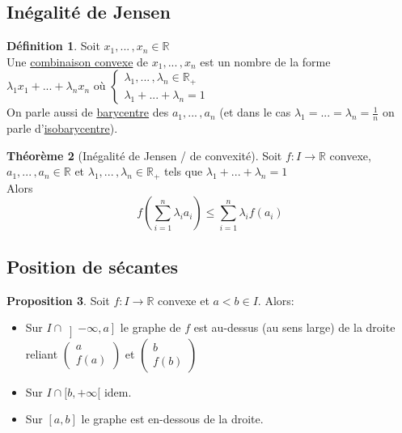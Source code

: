 \documentclass[10pt,a4paper]{article}
\theoremstyle{definition}
\newtheorem{proposition}{Proposition}[section]
\newtheorem{theorem}[proposition]{Théorème}
\newtheorem{definition}[proposition]{Définition}
\begin{document}
\subsection{Inégalité de Jensen}
\begin{definition}
Soit $x_1, ...\, , x_n \in \mathbb{R}$ \\
Une \uline{combinaison convexe} de $x_1, ...\, , x_n$ est un nombre de la forme $\lambda_1 x_1 + ... + \lambda_n x_n$ où $\begin{cases}
\lambda_1, ...\, , \lambda_n \in \mathbb{R}_+ \\
\lambda_1 + ... + \lambda_n = 1
\end{cases}$  \\
On parle aussi de \uline{barycentre} des $a_1, ...\, , a_n$ (et dans le cas $\lambda_1 = ... = \lambda_n = \frac{1}{n}$ on parle d'\uline{isobarycentre}).
\end{definition}
\begin{theorem}[Inégalité de Jensen / de convexité]
Soit $f: I \to \mathbb{R}$ convexe, $a_1, ...\, , a_n \in \mathbb{R}$ et $\lambda_1, ...\, , \lambda_n \in \mathbb{R}_+$ tels que $\lambda_1 + ... + \lambda_n = 1$ \\
Alors
\[f(\sum_{i = 1}^n \lambda_i a_i) \leq \sum_{i = 1}^n \lambda_i f(a_i)\]
\end{theorem}

\subsection{Position de sécantes}
\begin{proposition}
Soit $f:I \to \mathbb{R}$ convexe et $a < b \in I$. Alors:
\begin{itemize}
\item Sur $I \cap \left]-\infty, a\right]$ le graphe de $f$ est au-dessus (au sens large) de la droite reliant $\begin{pmatrix} a \\ f(a) \end{pmatrix}$ et $\begin{pmatrix} b \\ f(b) \end{pmatrix}$
\item Sur $I \cap [b, +\infty[$ idem.
\item Sur $[a, b]$ le graphe est en-dessous de la droite.
\end{itemize}
\end{proposition}
\end{document}
